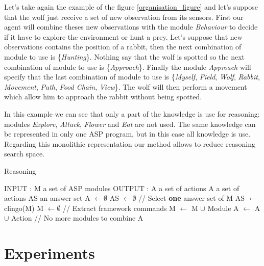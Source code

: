 \documentclass{aamas2012}
\begin{document}
	Let's take again the example of the figure \ref{organisation_figure} and let's suppose that the wolf just receive a set of new observation from its sensors.
	First our agent will combine theses new observations with the module \emph{Behaviour} to decide if it have to explore the environment or hunt a prey.
	Let's suppose that new observations contains the position of a rabbit, then the next combination of module to use is \{\emph{Hunting}\}.
	Nothing say that the wolf is spotted so the next combination of module to use is \{\emph{Approach}\}.
	Finally the module \emph{Approach} will specify that the last combination of module to use is 
	\{\emph{Myself}, \emph{Field}, \emph{Wolf}, \emph{Rabbit}, \emph{Movement}, \emph{Path}, \emph{Food Chain}, \emph{View}\}.
	The wolf will then perform a movement which allow him to approach the rabbit without being spotted.
	
	In this example we can see that only a part of the knowledge is use for reasoning: 
	modules \emph{Explore}, \emph{Attack}, \emph{Flower} and \emph{Eat} are not used.
	The same knowledge can be represented in only one ASP program, but in this case all knowledge is use.
	Regarding this monolithic representation our method allows to reduce reasoning search space.

	\begin{algorithm}
	\caption{Reasoning}
	\label{framework_algorithm}
	\begin{algorithmic}[1]
	\STATE INPUT : M a set of ASP modules
	\STATE OUTPUT : A a set of actions
	\newline
	\STATE A a set of actions
	\STATE AS an answer set
	\newline
	\STATE A $\leftarrow \emptyset$
	\STATE AS $\leftarrow \emptyset$
	\newline
	\REPEAT
		\STATE // Select \textbf{one} answer set of M
		\STATE AS $\leftarrow$ clingo(M)
		\STATE M $\leftarrow \emptyset$ 
		\newline
		\STATE // Extract framework commands
				\STATE M $\leftarrow$ M $\cup$ Module
			\ENDIF
				\STATE A $\leftarrow$ A $\cup$ Action
			\ENDIF
		\ENDFOR
	 // No more modules to combine
	\newline
	\RETURN A
	\end{algorithmic}
	\end{algorithm}

\section{Experiments}
\end{document}
